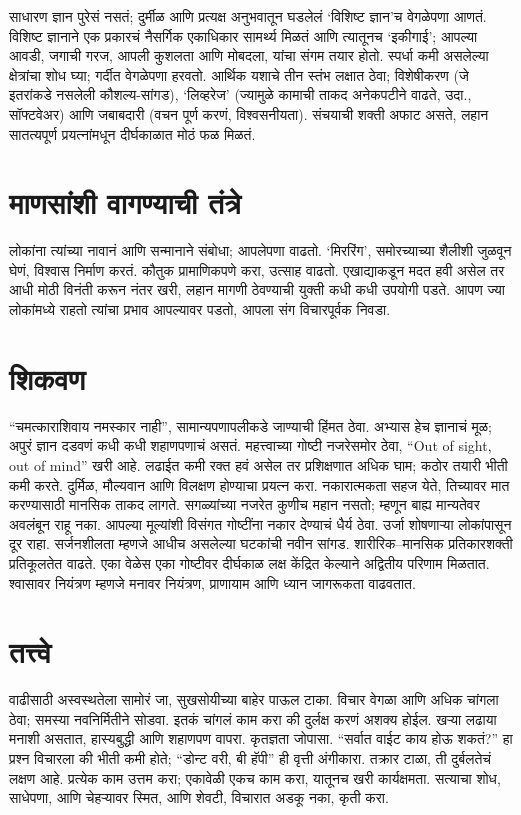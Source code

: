 साधारण ज्ञान पुरेसं नसतं; दुर्मीळ आणि प्रत्यक्ष अनुभवातून घडलेलं ‘विशिष्ट ज्ञान’च वेगळेपणा आणतं. विशिष्ट ज्ञानाने एक प्रकारचं नैसर्गिक एकाधिकार सामर्थ्य मिळतं आणि त्यातूनच ‘इकीगाई’; आपल्या आवडी, जगाची गरज, आपली कुशलता आणि मोबदला, यांचा संगम तयार होतो. स्पर्धा कमी असलेल्या क्षेत्रांचा शोध घ्या; गर्दीत वेगळेपणा हरवतो. आर्थिक यशाचे तीन स्तंभ लक्षात ठेवा; विशेषीकरण (जे इतरांकडे नसलेली कौशल्य-सांगड), ‘लिव्हरेज’ (ज्यामुळे कामाची ताकद अनेकपटीने वाढते, उदा., सॉफ्टवेअर) आणि जबाबदारी (वचन पूर्ण करणं, विश्वसनीयता). संचयाची शक्ती अफाट असते, लहान सातत्यपूर्ण प्रयत्नांमधून दीर्घकाळात मोठं फळ मिळतं.

\section*{माणसांशी वागण्याची तंत्रे}

लोकांना त्यांच्या नावानं आणि सन्मानाने संबोधा; आपलेपणा वाढतो. ‘मिररिंग’, समोरच्याच्या शैलीशी जुळवून घेणं, विश्वास निर्माण करतं. कौतुक प्रामाणिकपणे करा, उत्साह वाढतो. एखाद्याकडून मदत हवी असेल तर आधी मोठी विनंती करून नंतर खरी, लहान मागणी ठेवण्याची युक्ती कधी कधी उपयोगी पडते. आपण ज्या लोकांमध्ये राहतो त्यांचा प्रभाव आपल्यावर पडतो, आपला संग विचारपूर्वक निवडा.

\section*{शिकवण}

“चमत्काराशिवाय नमस्कार नाही”, सामान्यपणापलीकडे जाण्याची हिंमत ठेवा. अभ्यास हेच ज्ञानाचं मूळ; अपुरं ज्ञान दडवणं कधी कधी शहाणपणाचं असतं. महत्त्वाच्या गोष्टी नजरेसमोर ठेवा, “Out of sight, out of mind” खरी आहे. लढाईत कमी रक्त हवं असेल तर प्रशिक्षणात अधिक घाम; कठोर तयारी भीती कमी करते. दुर्मिळ, मौल्यवान आणि विलक्षण होण्याचा प्रयत्न करा. नकारात्मकता सहज येते, तिच्यावर मात करण्यासाठी मानसिक ताकद लागते. सगळ्यांच्या नजरेत कुणीच महान नसतो; म्हणून बाह्य मान्यतेवर अवलंबून राहू नका. आपल्या मूल्यांशी विसंगत गोष्टींना नकार देण्याचं धैर्य ठेवा. उर्जा शोषणाऱ्या लोकांपासून दूर राहा. सर्जनशीलता म्हणजे आधीच असलेल्या घटकांची नवीन सांगड. शारीरिक–मानसिक प्रतिकारशक्ती प्रतिकूलतेत वाढते. एका वेळेस एका गोष्टीवर दीर्घकाळ लक्ष केंद्रित केल्याने अद्वितीय परिणाम मिळतात. श्वासावर नियंत्रण म्हणजे मनावर नियंत्रण, प्राणायाम आणि ध्यान जागरूकता वाढवतात.

\section*{तत्त्वे}

वाढीसाठी अस्वस्थतेला सामोरं जा, सुखसोयीच्या बाहेर पाऊल टाका. विचार वेगळा आणि अधिक चांगला ठेवा; समस्या नवनिर्मितीने सोडवा. इतकं चांगलं काम करा की दुर्लक्ष करणं अशक्य होईल. खऱ्या लढाया मनाशी असतात, हास्यबुद्धी आणि शहाणपण वापरा. कृतज्ञता जोपासा. “सर्वात वाईट काय होऊ शकतं?” हा प्रश्न विचारला की भीती कमी होते; “डोन्ट वरी, बी हॅपी” ही वृत्ती अंगीकारा. तक्रार टाळा, ती दुर्बलतेचं लक्षण आहे. प्रत्येक काम उत्तम करा; एकावेळी एकच काम करा, यातूनच खरी कार्यक्षमता. सत्याचा शोध, साधेपणा, आणि चेहऱ्यावर स्मित, आणि शेवटी, विचारात अडकू नका, कृती करा.

